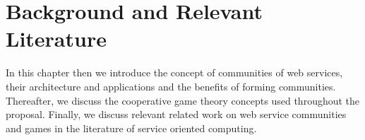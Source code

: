 \setcounter{chapter}{1}

\chapter{Background and Relevant Literature}\label{sec:MAS}

In this chapter then we introduce
the concept of communities of web services, their architecture and
applications and the benefits of forming communities. Thereafter,
we discuss the cooperative game theory concepts used throughout
the proposal. Finally, we discuss relevant related work on web
service communities and games in the literature of service
oriented computing.

%
%
%
